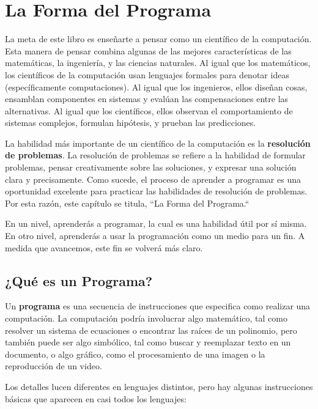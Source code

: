 \chapter{La Forma del Programa}

La meta de este libro es enseñarte a pensar como un científico de la 
computación. Esta manera de pensar combina algunas de las mejores características
de las matemáticas, la ingeniería, y las ciencias naturales. Al igual que los
matemáticos, los científicos de la computación usan lenguajes formales para denotar
ideas (específicamente computaciones). Al igual que los ingenieros, ellos diseñan cosas,
ensamblan componentes en sistemas y evalúan las compensaciones entre las alternativas.
Al igual que los científicos, ellos observan el comportamiento de sistemas complejos, 
formulan hipótesis, y prueban las predicciones. 

La habilidad más importante de un científico de la computación
es la {\bf resolución de problemas}. La resolución de problemas se refiere
a la habilidad de formular problemas, pensar creativamente sobre las
soluciones, y expresar una solución clara y precisamente. Como sucede, 
el proceso de aprender a programar es una oportunidad excelente para practicar 
las habilidades de resolución de problemas. Por esta razón, este capítulo se titula,
 ``La Forma del Programa.``

En un nivel, aprenderás a programar, la cual es una habilidad útil por sí misma.
En otro nivel, aprenderás a usar la programación como un medio para un fin. 
A medida que avancemos, este fin se volverá más claro.


\section{¿Qué es un Programa?}

Un {\bf programa} es una secuencia de instrucciones que especifica
como realizar una computación. La computación podría involucrar 
algo matemático, tal como resolver un sistema de ecuaciones o 
encontrar las raíces de un polinomio, pero también puede ser algo
simbólico, tal como buscar y reemplazar texto en un documento, o 
algo gráfico, como el procesamiento de una imagen o la reproducción 
de un video.

Los detalles lucen diferentes en lenguajes distintos, pero hay algunas
instrucciones básicas que aparecen en casi todos los lenguajes:

